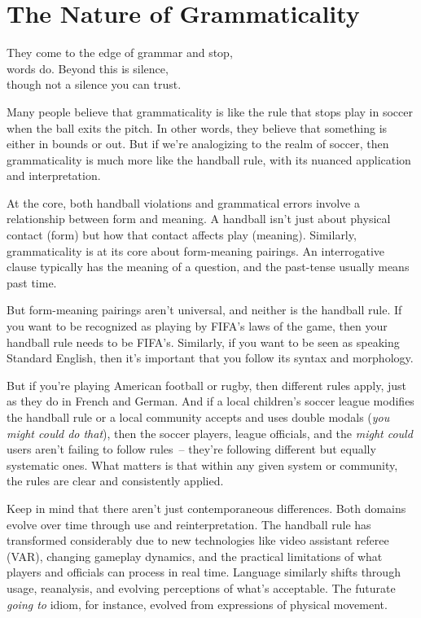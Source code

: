 \chapter{The Nature of Grammaticality} \label{ch:grammaticality}

\epigraph{They come to the edge of grammar and stop,\\
words do. Beyond this is silence,\\
though not a silence you can trust.}{}

Many people believe that grammaticality is like the rule that stops play in soccer when the ball exits the pitch. In other words, they believe that something is either in bounds or out. But if we're analogizing to the realm of soccer, then grammaticality is much more like the handball rule, with its nuanced application and interpretation.

At the core, both handball violations and grammatical errors involve a relationship between form and meaning. A handball isn't just about physical contact (form) but how that contact affects play (meaning). Similarly, grammaticality is at its core about form-meaning pairings. An interrogative clause typically has the meaning of a question, and the past-tense usually means past time.

But form-meaning pairings aren't universal, and neither is the handball rule. If you want to be recognized as playing by FIFA's laws of the game, then your handball rule needs to be FIFA's. Similarly, if you want to be seen as speaking Standard English, then it's important that you follow its syntax and morphology.

But if you're playing American football or rugby, then different rules apply, just as they do in French and German. And if a local children's soccer league modifies the handball rule or a local community accepts and uses double modals (\textit{you might could do that}), then the soccer players, league officials, and the \textit{might could} users aren't failing to follow rules~-- they're following different but equally systematic ones. What matters is that within any given system or community, the rules are clear and consistently applied.

Keep in mind that there aren't just contemporaneous differences. Both domains evolve over time through use and reinterpretation. The handball rule has transformed considerably due to new technologies like video assistant referee (VAR), changing gameplay dynamics, and the practical limitations of what players and officials can process in real time. Language similarly shifts through usage, reanalysis, and evolving perceptions of what's acceptable. The futurate \textit{going to} idiom, for instance, evolved from expressions of physical movement.

